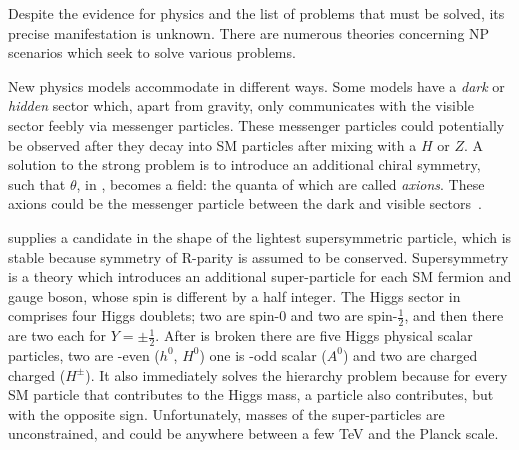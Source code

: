 
Despite the evidence for \bsm physics and the list of problems that must be solved, its precise
manifestation is unknown.
There are numerous theories concerning NP scenarios which seek to solve various problems.

New physics models accommodate \dm in different ways.
Some models have a \emph{dark} or \emph{hidden} sector which, apart from gravity, only
communicates with the visible sector feebly via messenger particles.
These messenger particles could potentially be observed after they decay into SM particles after
mixing with a $H$ or $Z$.
A solution to the strong \CP problem is to introduce an additional chiral symmetry, such that
$\theta$, in , becomes a field: the quanta of which are called \emph{axions}.
These axions could be the messenger particle between the dark and visible
sectors~\cite{Peccei:2006as}.










\SUSY supplies a \dm candidate in the shape of the lightest supersymmetric particle,
which is stable because symmetry of R-parity is assumed to be conserved.
Supersymmetry is a theory which introduces an additional super-particle for each SM fermion and
gauge boson, whose spin is different by a half integer.
The Higgs sector in \SUSY comprises four Higgs doublets; two are spin-0 and two are spin-$\tfrac12$,
and then there are two each for $Y=\pm\tfrac12$.
After \SUSY is broken there are five Higgs physical scalar particles, two are \CP-even ($h^0$,
$H^0$) one is \CP-odd scalar ($A^0$) and two are charged charged ($H^\pm$).
It also immediately solves the hierarchy problem because for every SM particle that contributes to
the Higgs mass, a \SUSY particle also contributes, but with the opposite sign.
Unfortunately, masses of the super-particles are unconstrained, and could be anywhere between a few
TeV and the Planck scale.

